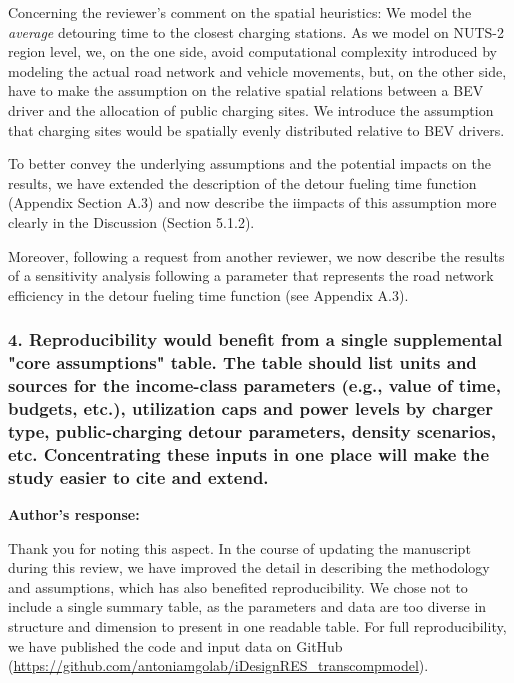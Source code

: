 \documentclass[11pt]{article}
\begin{document}
Concerning the reviewer's comment on the spatial heuristics: We model the \textit{average} detouring time to the closest charging stations. As we model on NUTS-2 region level, we, on the one side, avoid computational complexity introduced by modeling the actual road network and vehicle movements, but, on the other side, have to make the assumption on the relative spatial relations between a BEV driver and the allocation of public charging sites. We introduce the assumption that charging sites would be spatially evenly distributed relative to BEV drivers. 

To better convey the underlying assumptions and the potential impacts on the results, we have extended the description of the detour fueling time function (Appendix Section A.3) and now describe the iimpacts of this assumption more clearly in the Discussion (Section 5.1.2).

Moreover, following a request from another reviewer, we now describe the results of a sensitivity analysis following a parameter that represents the road network efficiency in the detour fueling time function (see Appendix A.3).

\color{reviewergrey}
\subsubsection*{4. Reproducibility would benefit from a single supplemental "core assumptions" table. The table should list units and sources for the income-class parameters (e.g., value of time, budgets, etc.), utilization caps and power levels by charger type, public-charging detour parameters, density scenarios, etc. Concentrating these inputs in one place will make the study easier to cite and extend.}
\color{authorblue}
\noindent \textcolor{authorblue}{\textbf{Author's response:}} 

Thank you for noting this aspect. In the course of updating the manuscript during this review, we have improved the detail in describing the methodology and assumptions, which has also benefited reproducibility. We chose not to include a single summary table, as the parameters and data are too diverse in structure and dimension to present in one readable table. For full reproducibility, we have published the code and input data on GitHub (\url{https://github.com/antoniamgolab/iDesignRES_transcompmodel}).

\color{reviewergrey}
\newpage
{}
\end{document}
